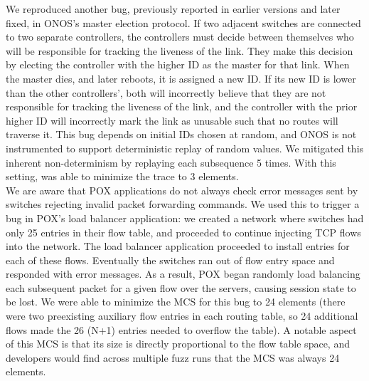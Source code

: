  We reproduced another bug,
previously reported in earlier versions and later fixed, in
ONOS's master election protocol. If two adjacent switches are connected to two
separate controllers, the controllers must decide between themselves who will
be responsible for tracking the liveness of the link. They make this decision
by electing the controller with the higher ID as the master for that link.
When the master dies, and later reboots, it is assigned a new ID. If
its new ID is lower than the other controllers', both will incorrectly
believe that they are not responsible for tracking the liveness of the link,
and the controller with the prior higher ID will incorrectly mark the link as
unusable such that no routes will traverse it. This bug depends on
initial IDs chosen at random, and ONOS is not instrumented to
support deterministic replay of random values. We mitigated this
inherent non-determinism by replaying each subsequence 5 times. With this setting,
\projectname{} was able to minimize the trace to 3 elements.\\[0.5ex]
 We are aware that POX
applications do not always check error messages sent by switches
rejecting invalid packet forwarding commands. We used this to trigger a bug in
POX's load balancer application: we created a network where switches had only
25 entries in their flow table, and proceeded to continue injecting TCP flows
into the network. The load balancer application proceeded to install entries
for each of these flows. Eventually the switches ran out of flow entry
space and responded with error messages. As a result, POX began randomly load
balancing each subsequent packet for a given flow over the servers, causing
session state to be lost. We were able to minimize the MCS for this
bug to 24 elements (there were two preexisting auxiliary flow entries in each
routing table, so 24 additional flows made the 26 (N+1) entries needed to
overflow the table). A notable aspect of this MCS is that its size is directly
proportional to the flow table space, and developers would find across multiple
fuzz runs that the MCS was always 24 elements.

